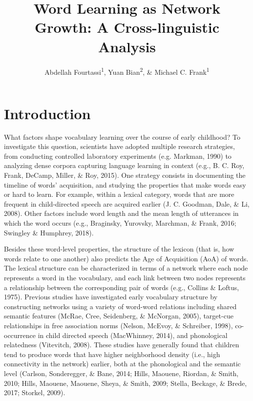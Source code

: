 \documentclass[english,floatsintext,man]{apa6}
\title{Word Learning as Network Growth: A Cross-linguistic Analysis}
\author{Abdellah Fourtassi\textsuperscript{1}, Yuan Bian\textsuperscript{2}, \& Michael C. Frank\textsuperscript{1}}
\affiliation{
    \vspace{0.5cm}
          \textsuperscript{1} Department of Psychology, Stanford University\\
          \textsuperscript{2} Department of Psychology, University of Illinois  }
\theoremstyle{definition}
\theoremstyle{definition}
\theoremstyle{definition}
\theoremstyle{remark}
\begin{document}
\maketitle

\setcounter{secnumdepth}{0}



\section{Introduction}\label{introduction}

What factors shape vocabulary learning over the course of early
childhood? To investigate this question, scientists have adopted
multiple research strategies, from conducting controlled laboratory
experiments (e.g. Markman, 1990) to analyzing dense corpora capturing
language learning in context (e.g., B. C. Roy, Frank, DeCamp, Miller, \&
Roy, 2015). One strategy consists in documenting the timeline of words'
acquisition, and studying the properties that make words easy or hard to
learn. For example, within a lexical category, words that are more
frequent in child-directed speech are acquired earlier (J. C. Goodman,
Dale, \& Li, 2008). Other factors include word length and the mean
length of utterances in which the word occurs (e.g., Braginsky,
Yurovsky, Marchman, \& Frank, 2016; Swingley \& Humphrey, 2018).

Besides these word-level properties, the structure of the lexicon (that
is, how words relate to one another) also predicts the Age of
Acquisition (AoA) of words. The lexical structure can be characterized
in terms of a network where each node represents a word in the
vocabulary, and each link between two nodes represents a relationship
between the corresponding pair of words (e.g., Collins \& Loftus, 1975).
Previous studies have investigated early vocabulary structure by
constructing networks using a variety of word-word relations including
shared semantic features (McRae, Cree, Seidenberg, \& McNorgan, 2005),
target-cue relationships in free association norms (Nelson, McEvoy, \&
Schreiber, 1998), co-occurrence in child directed speech (MacWhinney,
2014), and phonological relatedness (Vitevitch, 2008). These studies
have generally found that children tend to produce words that have
higher neighborhood density (i.e., high connectivity in the network)
earlier, both at the phonological and the semantic level (Carlson,
Sonderegger, \& Bane, 2014; Hills, Maouene, Riordan, \& Smith, 2010;
Hills, Maouene, Maouene, Sheya, \& Smith, 2009; Stella, Beckage, \&
Brede, 2017; Storkel, 2009).
\end{document}
